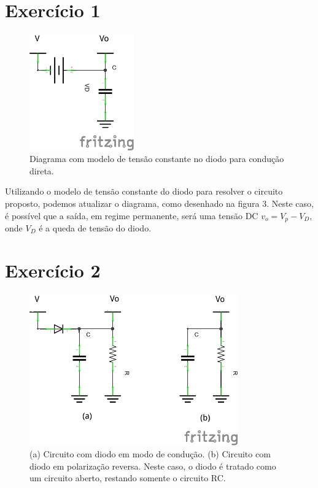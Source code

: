 \documentclass[12pt, a4paper, twoside]{article}
\begin{document}
\section{Exercício 1}

\begin{figure}[H]
    \centering
    \includegraphics[width=0.4\textwidth]{figs/rel4/ex1.png}
    \caption{Diagrama com modelo de tensão constante no diodo para condução direta.}
\end{figure}

Utilizando o modelo de tensão constante do diodo para resolver o circuito proposto, podemos atualizar o diagrama, como desenhado na figura 3. Neste caso, é possível que a saída, em regime permanente, será uma tensão DC $v_o = V_p - V_D$, onde $V_D$ é a queda de tensão do diodo.

\section{Exercício 2}

\begin{figure}[H]
    \centering
    \includegraphics[width=0.8\textwidth]{figs/rel4/ex2.png}
    \caption{(a) Circuito com diodo em modo de condução. (b) Circuito com diodo em polarização reversa. Neste caso, o diodo é tratado como um circuito aberto, restando somente o circuito RC.}
\end{figure}
\end{document}
